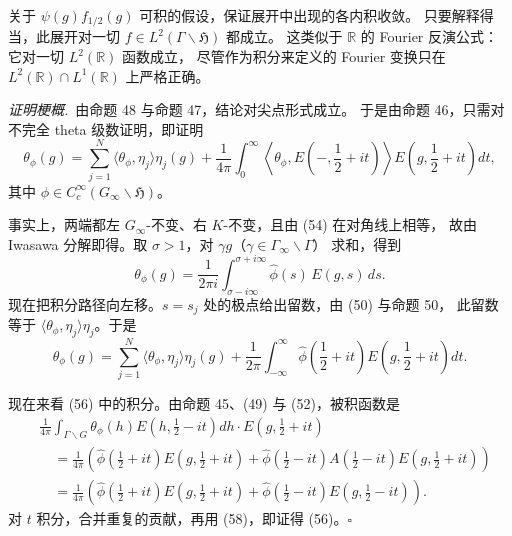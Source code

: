 \smallskip
关于 $\psi(g)f_{1/2}(g)$ 可积的假设，保证展开中出现的各内积收敛。
只要解释得当，此展开对一切 $f\in L^{2}(\Gamma\backslash\mathfrak{H})$ 都成立。
这类似于 $\mathbb{R}$ 的 Fourier 反演公式：它对一切 $L^{2}(\mathbb{R})$ 函数成立，
尽管作为积分来定义的 Fourier 变换只在 $L^{2}(\mathbb{R})\cap L^{1}(\mathbb{R})$ 上严格正确。

\smallskip
\noindent\emph{证明梗概.}\ 由命题 48 与命题 47，结论对尖点形式成立。
于是由命题 46，只需对不完全 theta 级数证明，即证明
\begin{equation}\tag{56}
\theta_{\phi}(g)=\sum_{j=1}^{N}\langle\theta_{\phi},\eta_{j}\rangle\eta_{j}(g)
+\frac{1}{4\pi}\int_{0}^{\infty}
\left\langle\theta_{\phi},E\left(-,\frac12+it\right)\right\rangle
E\left(g,\frac12+it\right)dt,
\end{equation}
其中 $\phi\in C_{c}^{\infty}(G_{\infty}\backslash\mathfrak{H})$。

事实上，两端都左 $G_{\infty}$-不变、右 $K$-不变，且由 (54) 在对角线上相等，
故由 Iwasawa 分解即得。取 $\sigma>1$，对 $\gamma g$（$\gamma\in\Gamma_{\infty}\backslash\Gamma$）
求和，得到
\begin{equation}\tag{57}
\theta_{\phi}(g)=\frac{1}{2\pi i}\int_{\sigma-i\infty}^{\sigma+i\infty}
\hat\phi(s)\,E(g,s)\,ds .
\end{equation}
现在把积分路径向左移。$s=s_{j}$ 处的极点给出留数，由 (50) 与命题 50，
此留数等于 $\langle\theta_{\phi},\eta_{j}\rangle\eta_{j}$。于是
\begin{equation}\tag{58}
\theta_{\phi}(g)=\sum_{j=1}^{N}\langle\theta_{\phi},\eta_{j}\rangle\eta_{j}(g)
+\frac{1}{2\pi}\int_{-\infty}^{\infty}
\hat\phi\left(\frac12+it\right)E\left(g,\frac12+it\right)dt .
\end{equation}

现在来看 (56) 中的积分。由命题 45、(49) 与 (52)，被积函数是
\[
\begin{aligned}
&\frac{1}{4\pi}\int_{\Gamma\backslash G}
\theta_{\phi}(h)E\left(h,\frac12-it\right)dh\cdot E\left(g,\frac12+it\right)\\
&\quad=\frac{1}{4\pi}\left(\hat\phi\left(\frac12+it\right)E\left(g,\frac12+it\right)
+\hat\phi\left(\frac12-it\right)A\left(\frac12-it\right)E\left(g,\frac12+it\right)\right)\\
&\quad=\frac{1}{4\pi}\left(\hat\phi\left(\frac12+it\right)E\left(g,\frac12+it\right)
+\hat\phi\left(\frac12-it\right)E\left(g,\frac12-it\right)\right).
\end{aligned}
\]
对 $t$ 积分，合并重复的贡献，再用 (58)，即证得 (56)。\hfill$\square$

